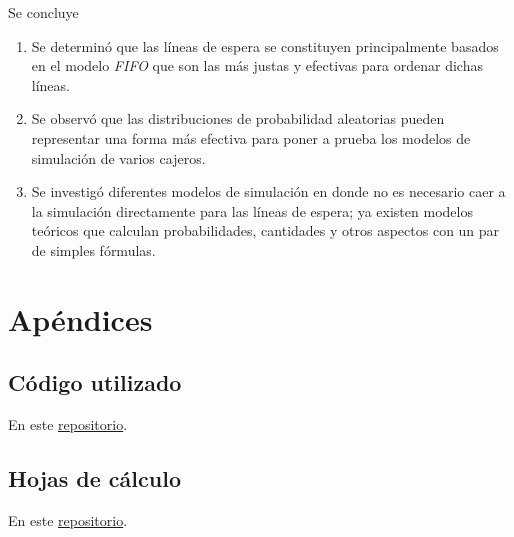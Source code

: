 \documentclass[journal]{IEEEtran}
\begin{document}
Se concluye \begin{enumerate}
	\item Se determinó que las líneas de espera se constituyen principalmente basados en el modelo \textit{FIFO} que son las más justas y efectivas para ordenar dichas líneas. 
	\item Se observó que las distribuciones de probabilidad aleatorias pueden representar una forma más efectiva para poner a prueba los modelos de simulación de varios cajeros. 
	\item Se investigó diferentes modelos de simulación en donde no es necesario caer a la simulación directamente para las líneas de espera; ya existen modelos teóricos que calculan probabilidades, cantidades y otros aspectos con un par de simples fórmulas. 
\end{enumerate}






\section*{Apéndices}
\subsection{Código utilizado}
En este
\href{https://github.com/RudiksChess/UVG-ModelacionYSimulacion-Notas-6-Semestre/tree/main/Proyecto\%201}{repositorio}.

\subsection{Hojas de cálculo}

En este \href{https://github.com/RudiksChess/UVG-ModelacionYSimulacion-Notas-6-Semestre/tree/main/Proyecto\%201}{repositorio}.

















 
\end{document}
